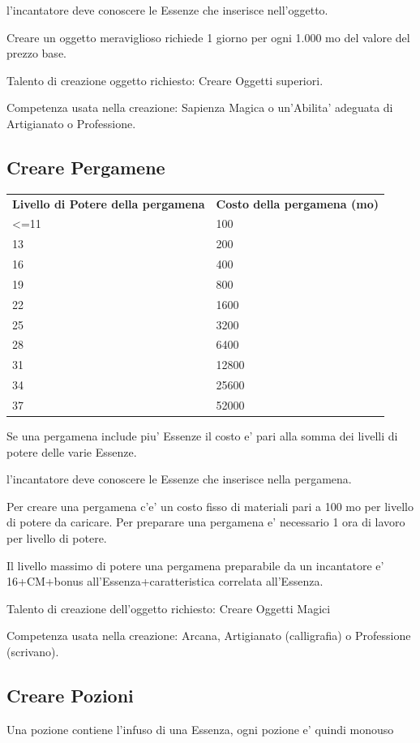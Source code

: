 \documentclass[a4paper,11pt,twoside,openany]{book}
\begin{document}
{l'incantatore deve conoscere le Essenze che inserisce nell'oggetto.

Creare un oggetto meraviglioso richiede 1 giorno per ogni 1.000 mo del valore del prezzo base.

Talento di creazione oggetto richiesto: Creare Oggetti superiori.

Competenza usata nella creazione: Sapienza Magica o un'Abilita' adeguata
di Artigianato o Professione.

\subsection{Creare Pergamene}

\begin{tabular}{ll}
\toprule
\textbf{Livello di Potere della pergamena} & \textbf{Costo della pergamena (mo)}\tabularnewline
\textless=11 & 100\tabularnewline
13 & 200\tabularnewline
16 & 400\tabularnewline
19 & 800\tabularnewline
22 & 1600\tabularnewline
25 & 3200\tabularnewline
28 & 6400\tabularnewline
31 & 12800\tabularnewline
34 & 25600\tabularnewline
37 & 52000\tabularnewline
\end{tabular}

\bigskip

Se una pergamena include piu' Essenze il costo e' pari alla somma dei livelli di potere delle varie Essenze.

l'incantatore deve conoscere le Essenze che inserisce nella pergamena.

Per creare una pergamena c'e' un costo fisso di materiali pari a 100 mo per livello di potere da caricare. Per preparare una pergamena e' necessario 1 ora di lavoro per livello di potere.

Il livello massimo di potere una pergamena preparabile da un incantatore e' 16+CM+bonus all'Essenza+caratteristica correlata all'Essenza.

Talento di creazione dell'oggetto richiesto: Creare Oggetti Magici

Competenza usata nella creazione: Arcana, Artigianato (calligrafia) o Professione (scrivano).

\subsection{Creare Pozioni}

Una pozione contiene l'infuso di una Essenza, ogni pozione e' quindi monouso

}
\end{document}
